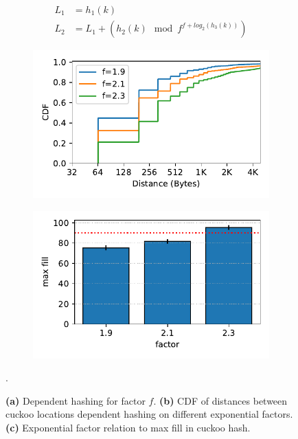 \begin{figure}[t]
    \centering
    \begin{subfigure}{0.3\linewidth}
        \begin{align*}
            L_1 &= h_1(k) \\
            L_2 &= L_1 + (h_2(k)\mod f^{f + log_2(h_3(k))})
        \end{align*}
    \end{subfigure}
    \begin{subfigure}{0.3\linewidth}
        \includegraphics[width=0.99\linewidth]{fig/hash_factor.pdf}
    \end{subfigure}
    \begin{subfigure}{0.3\linewidth}
        \includegraphics[width=0.99\linewidth]{fig/hash_fill.pdf}
    \end{subfigure}.
    \vspace{-1em}
    \caption{
    \textbf{(a)} Dependent hashing for factor $f$.
    \textbf{(b)} CDF of distances between cuckoo locations dependent hashing on different exponential factors.
    \textbf{(c)} Exponential factor relation to max fill in cuckoo hash.
    }
    \label{fig:locality-hashing}

\end{figure}




